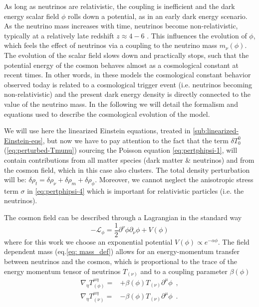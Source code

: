 As long as neutrinos are relativistic,
the coupling is inefficient and the dark energy scalar field $\phi$
rolls down a potential, as in an early dark energy scenario. As the
neutrino mass increases with time, neutrinos become non-relativistic,
typically at a relatively late redshift $z\approx4-6$ \cite{pettorino_neutrino_2010}.
This influences the evolution of $\phi$, which feels the effect of
neutrinos via a coupling to the neutrino mass $m_{\nu}(\phi)$. The
evolution of the scalar field slows down and practically stops, such
that the potential energy of the cosmon behaves almost as a cosmological
constant at recent times. In other words, in these models the cosmological
constant behavior observed today is related to a cosmological trigger
event (i.e. neutrinos becoming non-relativistic) and the present dark
energy density is directly connected to the value of the neutrino
mass. In the following we will detail the formalism and equations
used to describe the cosmological evolution of the model.

We will use here the linearized Einstein equations, treated in \cref{sub:linearized-Einstein-eqs}, 
but now we have to pay attention to the fact that the term $\delta T_{0}^{0}$ 
(\cref{eq:perturbed-Tmunu}) sourcing the Poisson equation \cref{eq:pertphipsi-1},
will contain contributions from all matter
species (dark matter \& neutrinos) and from the cosmon field, which in this case also clusters.
The total density perturbation will be: $\delta\rho_{t}=\delta\rho_{\nu}+\delta\rho_{m}+\delta\rho_{\phi}$.
Moreover, we cannot neglect the anisotropic stress term $\sigma$ in \cref{eq:pertphipsi-4} which is important for relativistic
particles (i.e. the neutrinos).


The cosmon field can be described through a Lagrangian in the standard
way 
\begin{equation}
-\mathcal{L_{\phi}}=\frac{1}{2}\partial^{\nu}\phi\partial_{\nu}\phi+V(\phi)
\end{equation}
where for this work we choose an exponential potential $V(\phi)\propto e^{-\alpha\phi}$.
The field dependent mass (eq.\ref{eq: mass_def}) allows for
an energy-momentum transfer between neutrinos and the cosmon, which
is proportional to the trace of the energy momentum tensor of neutrinos
$T_{(\nu)}$ and to a coupling parameter $\beta(\phi)$ 
\begin{align}
\nabla_{\eta}T_{(\phi)}^{\mu\eta}= & +\beta(\phi)T_{(\nu)}\partial^{\mu}\phi\,\,\,,\label{eq:continuity-phi}\\
\nabla_{\eta}T_{(\nu)}^{\mu\eta}= & -\beta(\phi)T_{(\nu)}\partial^{\mu}\phi\,\,\,.\label{eq:continuity-nu}
\end{align}


